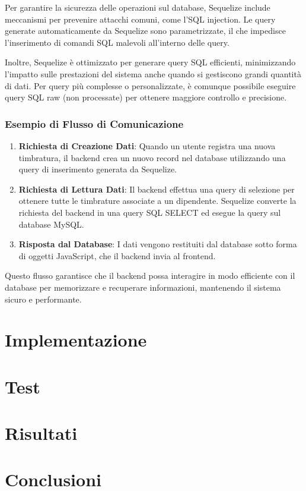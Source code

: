\documentclass[twoside]{supsistudent}
\begin{document}
Per garantire la sicurezza delle operazioni sul database, Sequelize include meccanismi per prevenire attacchi comuni, come l'SQL injection. Le query generate automaticamente da Sequelize sono parametrizzate, il che impedisce l'inserimento di comandi SQL malevoli all'interno delle query.

Inoltre, Sequelize è ottimizzato per generare query SQL efficienti, minimizzando l'impatto sulle prestazioni del sistema anche quando si gestiscono grandi quantità di dati. Per query più complesse o personalizzate, è comunque possibile eseguire query SQL raw (non processate) per ottenere maggiore controllo e precisione.

\subsection{Esempio di Flusso di Comunicazione}

\begin{enumerate}
  \item \textbf{Richiesta di Creazione Dati}: Quando un utente registra una nuova timbratura, il backend crea un nuovo record nel database utilizzando una query di inserimento generata da Sequelize.

  \item \textbf{Richiesta di Lettura Dati}: Il backend effettua una query di selezione per ottenere tutte le timbrature associate a un dipendente. Sequelize converte la richiesta del backend in una query SQL SELECT ed esegue la query sul database MySQL.

  \item \textbf{Risposta dal Database}: I dati vengono restituiti dal database sotto forma di oggetti JavaScript, che il backend invia al frontend.
\end{enumerate}

Questo flusso garantisce che il backend possa interagire in modo efficiente con il database per memorizzare e recuperare informazioni, mantenendo il sistema sicuro e performante.


\chapter{Implementazione}
\chapter{Test}
\chapter{Risultati}
\chapter{Conclusioni}


\cite{1705631}


\end{document}
